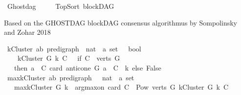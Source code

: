 %
\begin{isabellebody}%
%
%
\isadelimtheory
\isanewline
%
\endisadelimtheory
%
\isatagtheory
{}\isamarkupfalse%
\ Ghostdag\ \ \isanewline
\ \ \ TopSort\ blockDAG\ \isanewline
{}%
\endisatagtheory
{\isafoldtheory}%
%
\isadelimtheory
%
\endisadelimtheory
%
\isadelimdocument
%
\endisadelimdocument
%
\isatagdocument
%
\isamarkuptrue%
%
\endisatagdocument
{\isafolddocument}%
%
\isadelimdocument
%
\endisadelimdocument
%
\begin{isamarkuptext}%
Based on the GHOSTDAG blockDAG consensus algorithmus by Sompolinsky and Zohar 2018%
\end{isamarkuptext}\isamarkuptrue%
%
\isadelimdocument
%
\endisadelimdocument
%
\isatagdocument
%
\isamarkuptrue%
%
\endisatagdocument
{\isafolddocument}%
%
\isadelimdocument
%
\endisadelimdocument
{}\isamarkupfalse%
\ kCluster{\isacharcolon}{\kern0pt}{\isacharcolon}{\kern0pt}\ {\isachardoublequoteopen}{\isacharparenleft}{\kern0pt}{\isacharprime}{\kern0pt}a{\isacharcomma}{\kern0pt}{\isacharprime}{\kern0pt}b{\isacharparenright}{\kern0pt}\ pre{\isacharunderscore}{\kern0pt}digraph\ {\isasymRightarrow}\ nat\ {\isasymRightarrow}\ {\isacharprime}{\kern0pt}a\ set\ \ {\isasymRightarrow}\ bool{\isachardoublequoteclose}\isanewline
\ \ \ \ {\isachardoublequoteopen}kCluster\ G\ k\ C\ {\isacharequal}{\kern0pt}\ \ {\isacharparenleft}{\kern0pt}if\ {\isacharparenleft}{\kern0pt}C\ {\isasymsubseteq}\ {\isacharparenleft}{\kern0pt}verts\ G{\isacharparenright}{\kern0pt}{\isacharparenright}{\kern0pt}\isanewline
\ \ \ then\ {\isacharparenleft}{\kern0pt}{\isasymforall}a\ {\isasymin}\ C{\isachardot}{\kern0pt}\ card\ {\isacharparenleft}{\kern0pt}{\isacharparenleft}{\kern0pt}anticone\ G\ a{\isacharparenright}{\kern0pt}\ {\isasyminter}\ C{\isacharparenright}{\kern0pt}\ {\isasymle}\ k{\isacharparenright}{\kern0pt}\ else\ False{\isacharparenright}{\kern0pt}{\isachardoublequoteclose}\isanewline
\isanewline
{}\isamarkupfalse%
\ max{\isacharunderscore}{\kern0pt}kCluster{\isacharcolon}{\kern0pt}{\isacharcolon}{\kern0pt}\ {\isachardoublequoteopen}{\isacharparenleft}{\kern0pt}{\isacharprime}{\kern0pt}a{\isacharcomma}{\kern0pt}{\isacharprime}{\kern0pt}b{\isacharparenright}{\kern0pt}\ pre{\isacharunderscore}{\kern0pt}digraph\ \ {\isasymRightarrow}\ nat\ {\isasymRightarrow}\ {\isacharprime}{\kern0pt}a\ set{\isachardoublequoteclose}\isanewline
\ \ \ {\isachardoublequoteopen}max{\isacharunderscore}{\kern0pt}kCluster\ G\ k\ {\isacharequal}{\kern0pt}\ arg{\isacharunderscore}{\kern0pt}max{\isacharunderscore}{\kern0pt}on\ card\ {\isacharbraceleft}{\kern0pt}C\ {\isasymin}\ {\isacharparenleft}{\kern0pt}Pow\ {\isacharparenleft}{\kern0pt}verts\ G{\isacharparenright}{\kern0pt}{\isacharparenright}{\kern0pt}{\isachardot}{\kern0pt}\ kCluster\ G\ k\ C{\isacharbraceright}{\kern0pt}{\isachardoublequoteclose}\isanewline

\end{isabellebody}
